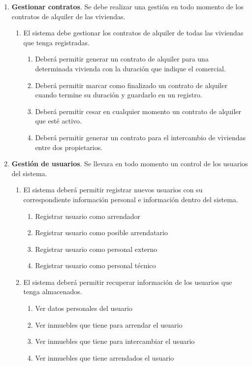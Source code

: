 \documentclass[10pt,a4paper]{article}
\begin{document}
{\begin{enumerate}[\bfseries RF-1]
\item \textbf{Gestionar contratos}. Se debe realizar una gestión en todo momento de los contratos de alquiler de las viviendas.
\begin{enumerate}[\bfseries RF-{4}.1]
\item El sistema debe gestionar los contratos de alquiler de todas las viviendas que tenga registradas.
\begin{enumerate}[\bfseries RF-{4}.{1}.1]
\item Deberá permitir generar un contrato de alquiler para una determinada vivienda con la duración que indique el comercial.
\item Deberá permitir marcar como finalizado un contrato de alquiler cuando termine su duración y guardarlo en un registro.
\item Deberá permitir cesar en cualquier momento un contrato de alquiler que esté activo.
\item Deberá permitir generar un contrato para el intercambio de viviendas entre dos propietarios.
\end{enumerate}
\end{enumerate}
\item \textbf{Gestión de usuarios}. Se llevara en todo momento un control de los usuarios del sistema.
\begin{enumerate}[\bfseries RF-{5}.1]
\item El sistema deberá permitir registrar nuevos usuarios con su correspondiente información personal e información dentro del sistema.
\begin{enumerate}[\bfseries RF-{5}.{1}.1]
\item Registrar usuario como arrendador
\item Registrar usuario como posible arrendatario
\item Registrar usuario como personal externo
\item Registrar usuario como personal técnico
\end{enumerate}
\item El sistema deberá permitir recuperar información de los usuarios que tenga almacenados.
\begin{enumerate}[\bfseries RF-{5}.{2}.1]
\item Ver datos personales del usuario
\item Ver inmuebles que tiene para arrendar el usuario
\item Ver inmuebles que tiene para intercambiar el usuario
\item Ver inmuebles que tiene arrendados el usuario

\end{enumerate}
\end{enumerate}
\end{enumerate}}
\end{document}
